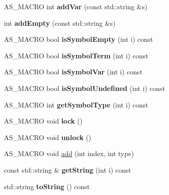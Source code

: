 \begin{DoxyCompactItemize}
\item 
\mbox{\label{classx2_1_1_gramma_symbols_a6ca7cacf622113005532d791c46116de}} 
A\+S\+\_\+\+M\+A\+C\+RO int {\bfseries add\+Var} (const std\+::string \&s)
\item 
\mbox{\label{classx2_1_1_gramma_symbols_a21edf771f7aaec70f68986f9e3afa695}} 
int {\bfseries add\+Empty} (const std\+::string \&s)
\item 
\mbox{\label{classx2_1_1_gramma_symbols_ac6f411be6b4aacc787529f2dfda62206}} 
A\+S\+\_\+\+M\+A\+C\+RO bool {\bfseries is\+Symbol\+Empty} (int i) const
\item 
\mbox{\label{classx2_1_1_gramma_symbols_abca42f33cb4b60fd0b453d45cfc8b840}} 
A\+S\+\_\+\+M\+A\+C\+RO bool {\bfseries is\+Symbol\+Term} (int i) const
\item 
\mbox{\label{classx2_1_1_gramma_symbols_a9830ca4cc32612f2623e7a80958d0f5c}} 
A\+S\+\_\+\+M\+A\+C\+RO bool {\bfseries is\+Symbol\+Var} (int i) const
\item 
\mbox{\label{classx2_1_1_gramma_symbols_a8da925b02b1665354cbcab34a0d75997}} 
A\+S\+\_\+\+M\+A\+C\+RO bool {\bfseries is\+Symbol\+Undefined} (int i) const
\item 
\mbox{\label{classx2_1_1_gramma_symbols_a8cbd02389dab71a483c5f84b1ab6d7a5}} 
A\+S\+\_\+\+M\+A\+C\+RO int {\bfseries get\+Symbol\+Type} (int i) const
\item 
\mbox{\label{classx2_1_1_gramma_symbols_aa1b6ad018528b2f9e28e7038d402ea22}} 
A\+S\+\_\+\+M\+A\+C\+RO void {\bfseries lock} ()
\item 
\mbox{\label{classx2_1_1_gramma_symbols_a0c3a36f033f9f07ee26684b3ddaf203f}} 
A\+S\+\_\+\+M\+A\+C\+RO void {\bfseries unlock} ()
\item 
A\+S\+\_\+\+M\+A\+C\+RO void \hyperlink{classx2_1_1_gramma_symbols_a5fb0d8e67e6eb5e0b3d36220aa562f1b}{add} (int index, int type)
\item 
\mbox{\label{classx2_1_1_gramma_symbols_a895393111b5212412a5a080e2853f74d}} 
const std\+::string \& {\bfseries get\+String} (int i) const
\item 
\mbox{\label{classx2_1_1_gramma_symbols_ac4f3fb44fcb792d6d19146bbe6c31812}} 
std\+::string {\bfseries to\+String} () const
\end{DoxyCompactItemize}
